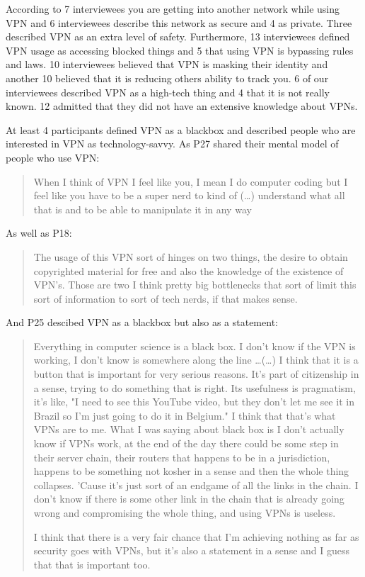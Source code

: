 According to 7 interviewees you are getting into another network while using
VPN and 6 interviewees describe this network as secure and 4 as private. 
Three described VPN as an extra level of safety. Furthermore, 13 interviewees
defined VPN usage as accessing blocked things and 5 that using VPN is
bypassing rules and laws. 10 interviewees believed that VPN is masking their
identity and another 10 believed that it is reducing others ability to track
you.  6 of our interviewees described VPN as a high-tech thing and 4 that it
is not really known. 12 admitted that they did not have an extensive knowledge
about VPNs.

At least 4 participants defined VPN as a blackbox and described people who are
interested in VPN as technology-savvy. As P27 shared their mental model of
people who use VPN: \begin{quote}When I think of VPN I feel like you, I mean I
do computer coding but I feel like you have to be a super nerd to kind of
(\dots) understand what all that is and to be able to manipulate it in any
way\end{quote}


As well as P18: \begin{quote}The usage of this VPN sort of hinges on two
things, the desire to obtain copyrighted material for free and also the
knowledge of the existence of VPN's. Those are two I think pretty big
bottlenecks that sort of limit this sort of information to sort of tech nerds,
if that makes sense.\end{quote}


And P25 descibed VPN as a blackbox but also as a statement:
\begin{quote}Everything in computer science is a black box. I don't know if
    the VPN is working, I don't know is somewhere along the line \dots (\dots)
    I think that it is a button that is important for very serious reasons.
    It's part of citizenship in a sense, trying to do something that is right.
    Its usefulness is pragmatism, it's like, "I need to see this YouTube
    video, but they don't let me see it in Brazil so I'm just going to do it
    in Belgium." I think that that's what VPNs are to me. What I was saying
    about black box is I don't actually know if VPNs work, at the end of the
    day there could be some step in their server chain, their routers that
    happens to be in a jurisdiction, happens to be something not kosher in a
    sense and then the whole thing collapses. 'Cause it's just sort of an
    endgame of all the links in the chain. I don't know if there is some other
    link in the chain that is already going wrong and compromising the whole
    thing, and using VPNs is useless.


I think that there is a very fair chance that I'm achieving nothing as far as
security goes with VPNs, but it's also a statement in a sense and I guess that
that is important too.\end{quote}

